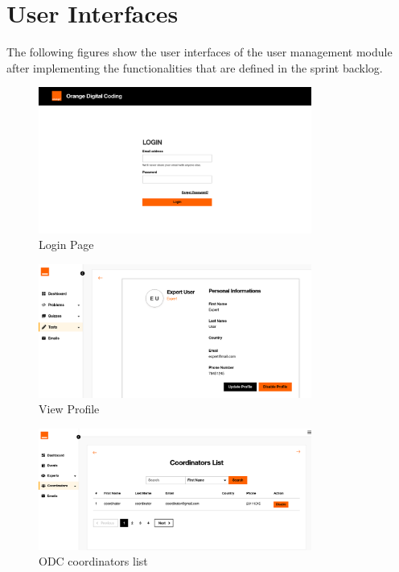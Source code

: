 \section{User Interfaces}

The following figures show the user interfaces of the user management module after implementing
the functionalities that are defined in the sprint backlog.

\begin{figure}[h!]
  \centering
  \includegraphics[width=0.8\textwidth, height=0.3\textheight]{images/odc-login.png}
  \caption{Login Page}
\end{figure}

\begin{figure}[h!]
  \centering
  \includegraphics[width=0.8\textwidth, height=0.3\textheight]{images/odc-view-profile.png}
  \caption{View Profile}
\end{figure}


\begin{figure}[h!]
  \centering
  \includegraphics[width=0.8\textwidth, height=0.3\textheight]{images/odc-coordinators-list.png}
  \caption{ODC coordinators list}
\end{figure}


